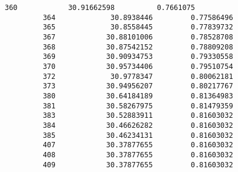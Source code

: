 \documentclass[11pt]{article}
\begin{document}
\begin{Verbatim}[commandchars=\\\{\}]
         360            30.91662598          0.7661075   
         364             30.8938446         0.77586496   
         365             30.8558445         0.77839732   
         367            30.88101006         0.78528708   
         368            30.87542152         0.78809208   
         369            30.90934753         0.79330558   
         370            30.95734406         0.79510754   
         372             30.9778347         0.80062181   
         373            30.94956207         0.80217767   
         380            30.64184189         0.81364983   
         381            30.58267975         0.81479359   
         383            30.52883911         0.81603032   
         384            30.46626282         0.81603032   
         385            30.46234131         0.81603032   
         407            30.37877655         0.81603032   
         408            30.37877655         0.81603032   
         409            30.37877655         0.81603032   
         

\end{Verbatim}
\end{document}
